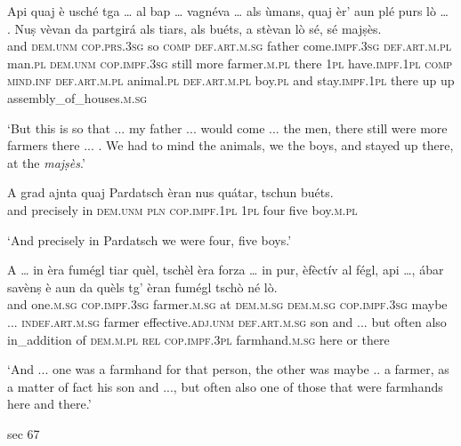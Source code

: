 \begin{linenumbers}
	\gll Api quaj è usché tga … al bap … vagnéva … als ùmans, quaj èr’ aun plé purs lò … . Nuṣ vèvan da partgirá als tiars, als buéts, a stèvan lò sé, sé majṣès.   \\
	and \textsc{dem.unm} \textsc{cop.prs.3sg} so \textsc{comp} {} \textsc{def.art.m.sg} father {} come.\textsc{impf.3sg} {} \textsc{def.art.m.pl} man.\textsc{pl} \textsc{dem.unm} \textsc{cop.impf.3sg} still more farmer.\textsc{m.pl} there {} {} \textsc{1pl} have.\textsc{impf.1pl} \textsc{comp} \textsc{mind.inf} \textsc{def.art.m.pl} animal.\textsc{pl} \textsc{def.art.m.pl} boy.\textsc{pl} and stay.\textsc{impf.1pl} there up up assembly\_of\_houses.\textsc{m.sg}\\
\end{linenumbers}
\medskip
\glt `But this is so that ... my father ... would come ... the men, there still were more farmers there ... . We had to mind the animals, we the boys, and stayed up there, at the \textit{majṣès}.'
\medskip

\begin{linenumbers}
	\gll A grad ajnta quaj Pardatsch èran nus quátar, tschun buéts.   \\
	and precisely in \textsc{dem.unm} \textsc{pln} \textsc{cop.impf.1pl} \textsc{1pl} four five boy.\textsc{m.pl}\\
\end{linenumbers}
\medskip
\glt `And precisely in Pardatsch we were four, five boys.'
\medskip

\begin{linenumbers}
	\gll A … in èra fumégl tiar quèl, tschèl èra forza … in pur, èfèctív al fégl, api …, ábar savènṣ è aun da quèls tg’ èran fumégl tschò né lò.\\
	and {} one.\textsc{m.sg} \textsc{cop.impf.3sg} farmer.\textsc{m.sg} at \textsc{dem.m.sg} \textsc{dem.m.sg} \textsc{cop.impf.3sg} maybe ... \textsc{indef.art.m.sg} farmer effective.\textsc{adj.unm} \textsc{def.art.m.sg} son and ... but often also in\_addition of \textsc{dem.m.pl} \textsc{rel} \textsc{cop.impf.3pl} farmhand.\textsc{m.sg} here or there\\
\end{linenumbers}
\medskip
\glt `And ... one was a farmhand for that person, the other was maybe .. a farmer, as a matter of fact his son and ..., but often also one of those that were farmhands here and there.'
\medskip

sec 67

